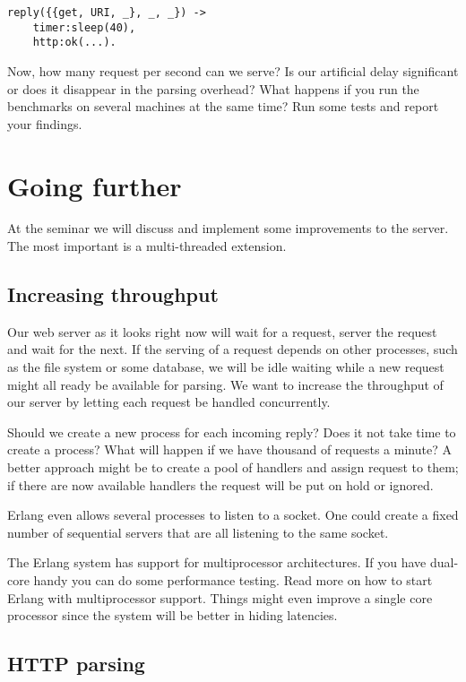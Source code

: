 \documentclass[a4paper, 11pt]{article}
\begin{document}
\begin{verbatim}
reply({{get, URI, _}, _, _}) ->    
    timer:sleep(40),
    http:ok(...).
\end{verbatim}

Now, how many request per second can we serve? Is our artificial delay
significant or does it disappear in the parsing overhead? What happens
if you run the benchmarks on several machines at the same time? Run
some tests and report your findings.

\section{Going further}

At the seminar we will discuss and implement some improvements to the
server. The most important is a multi-threaded extension.

\subsection{Increasing throughput}

Our web server as it looks right now will wait for a request, server
the request and wait for the next. If the serving of a request depends
on other processes, such as the file system or some database, we will
be idle waiting while a new request might all ready be available for
parsing. We want to increase the throughput of our server by letting
each request be handled concurrently.

Should we create a new process for each incoming reply? Does it not
take time to create a process? What will happen if we have thousand of
requests a minute? A better approach might be to create a pool of
handlers and assign request to them; if there are now available
handlers the request will be put on hold or ignored. 

Erlang even allows several processes to listen to a socket. One could
create a fixed number of sequential servers that are all listening to
the same socket.

The Erlang system has support for multiprocessor architectures. If you
have dual-core handy you can do some performance testing. Read more on
how to start Erlang with multiprocessor support. Things might even
improve a single core processor since the system will be better in
hiding latencies.


\subsection{HTTP parsing}
\end{document}
